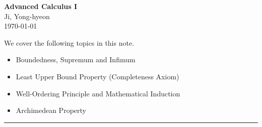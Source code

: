 \documentclass[11pt,openany]{article}
\begin{document}
\begin{center}
	\huge\textbf{Advanced Calculus I}\\
	\vspace{0.5em}
	\large{Ji, Yong-hyeon}\\
	\vspace{0.5em}
	\normalsize{\today}\\
\end{center}

\noindent We cover the following topics in this note.
\begin{itemize}
	\item Boundedness, Supremum and Infimum
	\item Least Upper Bound Property (Completeness Axiom)
	\item Well-Ordering Principle and Mathematical Induction
	\item Archimedean Property
\end{itemize}
\hrule\vspace{12pt}
\begin{observation}
	\ \begin{center}
		
	\end{center}
\end{observation}
\vfill
{}

\newpage
\tableofcontents
\vfill
\end{document}
